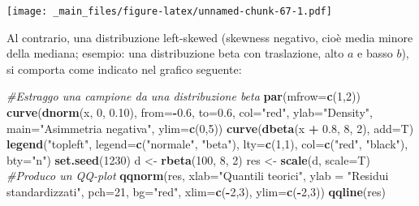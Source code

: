 \documentclass[a4paper,12pt,oneside]{book}
\newenvironment{Shaded}{\begin{snugshade}}{\end{snugshade}}
\newcommand{\KeywordTok}[1]{\textcolor[rgb]{0.13,0.29,0.53}{\textbf{#1}}}
\newcommand{\DataTypeTok}[1]{\textcolor[rgb]{0.13,0.29,0.53}{#1}}
\newcommand{\DecValTok}[1]{\textcolor[rgb]{0.00,0.00,0.81}{#1}}
\newcommand{\FloatTok}[1]{\textcolor[rgb]{0.00,0.00,0.81}{#1}}
\newcommand{\StringTok}[1]{\textcolor[rgb]{0.31,0.60,0.02}{#1}}
\newcommand{\CommentTok}[1]{\textcolor[rgb]{0.56,0.35,0.01}{\textit{#1}}}
\newcommand{\OperatorTok}[1]{\textcolor[rgb]{0.81,0.36,0.00}{\textbf{#1}}}
\newcommand{\NormalTok}[1]{#1}
\theoremstyle{definition}
\theoremstyle{definition}
\theoremstyle{definition}
\theoremstyle{remark}
\begin{document}
\texttt{[image: \_main\_files/figure-latex/unnamed-chunk-67-1.pdf]}

Al contrario, una distribuzione left-skewed (skewness negativo, cioè
media minore della mediana; esempio: una distribuzione beta con
traslazione, alto \(a\) e basso \(b\)), si comporta come indicato nel
grafico seguente:

\begin{Shaded}
\begin{Highlighting}[]
\CommentTok{#Estraggo una campione da una distribuzione beta}
\KeywordTok{par}\NormalTok{(}\DataTypeTok{mfrow=}\KeywordTok{c}\NormalTok{(}\DecValTok{1}\NormalTok{,}\DecValTok{2}\NormalTok{))}
\KeywordTok{curve}\NormalTok{(}\KeywordTok{dnorm}\NormalTok{(x, }\DecValTok{0}\NormalTok{, }\FloatTok{0.10}\NormalTok{), }\DataTypeTok{from=}\OperatorTok{-}\FloatTok{0.6}\NormalTok{, }\DataTypeTok{to=}\FloatTok{0.6}\NormalTok{, }\DataTypeTok{col=}\StringTok{"red"}\NormalTok{, }
      \DataTypeTok{ylab=}\StringTok{"Density"}\NormalTok{, }\DataTypeTok{main=}\StringTok{"Asimmetria negativa"}\NormalTok{,}
      \DataTypeTok{ylim=}\KeywordTok{c}\NormalTok{(}\DecValTok{0}\NormalTok{,}\DecValTok{5}\NormalTok{))}
\KeywordTok{curve}\NormalTok{(}\KeywordTok{dbeta}\NormalTok{(x }\OperatorTok{+}\StringTok{ }\FloatTok{0.8}\NormalTok{, }\DecValTok{8}\NormalTok{, }\DecValTok{2}\NormalTok{), }\DataTypeTok{add=}\NormalTok{T)}
\KeywordTok{legend}\NormalTok{(}\StringTok{"topleft"}\NormalTok{, }\DataTypeTok{legend=}\KeywordTok{c}\NormalTok{(}\StringTok{"normale"}\NormalTok{, }\StringTok{"beta"}\NormalTok{),}
       \DataTypeTok{lty=}\KeywordTok{c}\NormalTok{(}\DecValTok{1}\NormalTok{,}\DecValTok{1}\NormalTok{), }\DataTypeTok{col=}\KeywordTok{c}\NormalTok{(}\StringTok{"red"}\NormalTok{, }\StringTok{"black"}\NormalTok{), }\DataTypeTok{bty=}\StringTok{"n"}\NormalTok{)}
\KeywordTok{set.seed}\NormalTok{(}\DecValTok{1230}\NormalTok{)}
\NormalTok{d <-}\StringTok{ }\KeywordTok{rbeta}\NormalTok{(}\DecValTok{100}\NormalTok{, }\DecValTok{8}\NormalTok{, }\DecValTok{2}\NormalTok{)}
\NormalTok{res <-}\StringTok{ }\KeywordTok{scale}\NormalTok{(d, }\DataTypeTok{scale=}\NormalTok{T)}
\CommentTok{#Produco un QQ-plot}
\KeywordTok{qqnorm}\NormalTok{(res, }\DataTypeTok{xlab=}\StringTok{"Quantili teorici"}\NormalTok{, }
     \DataTypeTok{ylab =} \StringTok{"Residui  standardizzati"}\NormalTok{, }
     \DataTypeTok{pch=}\DecValTok{21}\NormalTok{, }\DataTypeTok{bg=}\StringTok{"red"}\NormalTok{, }\DataTypeTok{xlim=}\KeywordTok{c}\NormalTok{(}\OperatorTok{-}\DecValTok{2}\NormalTok{,}\DecValTok{3}\NormalTok{), }\DataTypeTok{ylim=}\KeywordTok{c}\NormalTok{(}\OperatorTok{-}\DecValTok{2}\NormalTok{,}\DecValTok{3}\NormalTok{))}
\KeywordTok{qqline}\NormalTok{(res)}
\end{Highlighting}
\end{Shaded}
\end{document}

